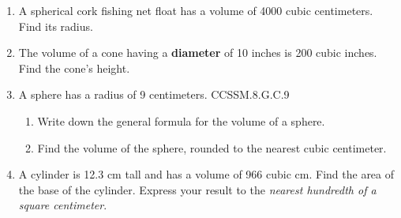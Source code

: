 \begin{enumerate}
\item A spherical cork fishing net float has a volume of 4000 cubic centimeters. Find its radius. \vspace{2cm}

\item The volume of a cone having a \textbf{diameter} of 10 inches is 200 cubic inches. Find the cone's height.
  

\item A sphere has a radius of 9 centimeters. \hfill CCSSM.8.G.C.9
\begin{enumerate}
  \item Write down the general formula for the volume of a sphere. \vspace{1cm}
  \item Find the volume of the sphere, rounded to the nearest cubic centimeter.
\end{enumerate}  \vspace{3cm}

\item A cylinder is 12.3 cm tall and has a volume of 966 cubic cm. Find the area of the base of the cylinder. Express your result to the \emph{nearest hundredth of a square centimeter}. \vspace{3cm}



\end{enumerate}
